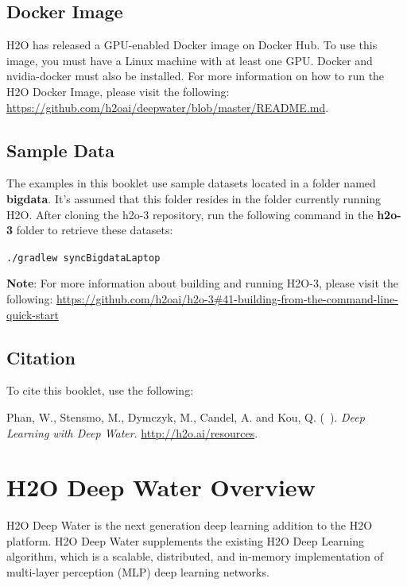 	\subsection{Docker Image}
		H2O has released a GPU-enabled Docker image on Docker Hub. To use this image, you must have a Linux machine with at least one GPU. Docker and nvidia-docker must also be installed. For more information on how to run the H2O Docker Image, please visit the following: {\url{https://github.com/h2oai/deepwater/blob/master/README.md}}.

	\subsection{Sample Data}

		The examples in this booklet use sample datasets located in a folder named \textbf{bigdata}. It's assumed that this folder resides in the folder currently running H2O. After cloning the h2o-3 repository, run the following command in the \textbf{h2o-3} folder to retrieve these datasets:

\texttt{./gradlew syncBigdataLaptop}

		\textbf{Note}: For more information about building and running H2O-3, please visit the following: {\url{https://github.com/h2oai/h2o-3#41-building-from-the-command-line-quick-start}}

	\subsection{Citation}

	To cite this booklet, use the following: 

Phan, W., Stensmo, M., Dymczyk, M., Candel, A. and Kou, Q. (\shortmonthname\ \the\year). {\textit{Deep Learning with Deep Water}}. {\url{http://h2o.ai/resources}}.

\section{H2O Deep Water Overview}
H2O Deep Water is the next generation deep learning addition to the H2O platform.  H2O Deep Water supplements the existing H2O Deep Learning algorithm, which is a scalable, distributed, and in-memory implementation of multi-layer perception (MLP) deep learning networks.

